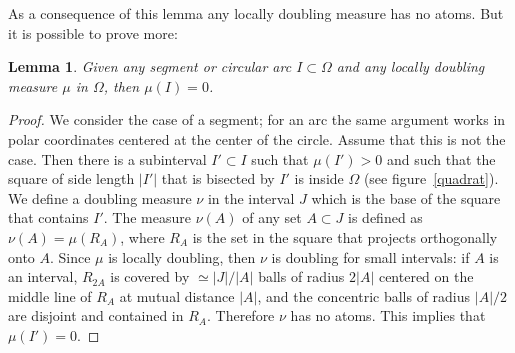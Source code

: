 \documentclass[12pt,twoside,final,psamsfonts]{amsart}
\theoremstyle{plain}
\newtheorem{lema}{Lemma}
\theoremstyle{remark}
\theoremstyle{definition}
\begin{document}
As a consequence of this lemma any locally doubling measure has no atoms. But it
is possible to prove more:
\begin{lema}\label{dos} 
Given any segment or circular arc $I\subset\Omega$ and any locally doubling measure
$\mu$ in $\Omega$, then $\mu(I)=0$.
\end{lema}
\begin{proof}
We consider the case of a segment; for an arc the same argument works in
polar coordinates centered at the center of the circle.
Assume that this is not the case. Then there is a subinterval $I'\subset I$ 
such that $\mu(I')>0$ and such that the square
of side length $|I'|$ that is bisected by $I'$ is inside $\Omega$ (see
figure~\ref{quadrat}). 
We define a  doubling 
measure $\nu$ in the interval $J$ which is the base
of the square that contains $I'$. The measure $\nu(A)$ of any set $A\subset J$ 
is defined as
$\nu(A)=\mu(R_A)$, where $R_A$ is the set in the square that projects orthogonally onto
$A$. Since $\mu$ is locally doubling, then $\nu$ is doubling for small
intervals: if $A$ is an interval, $R_{2A}$ is covered by $\simeq|J|/|A|$ balls
of radius $2|A|$ centered on the middle line of $R_A$ at mutual distance $|A|$,
and the concentric balls of radius $|A|/2$ are disjoint and contained in $R_A$.
Therefore $\nu$ has
no atoms. This implies that $\mu(I')=0$.
\end{proof}
\end{document}

